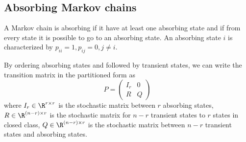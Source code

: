 \begin{refsection}
\subsection{Absorbing Markov chains}
\begin{definition}
	A Markov chain is absorbing if it have at least one absorbing state and if from every state it is possible to go to an absorbing state. An absorbing state $i$ is characterized by $p_{ii} = 1, p_{ij}=0,j\neq i$. 
\end{definition}

\begin{lemma}
	By ordering absorbing states and followed by transient states, we can write the transition matrix in the partitioned form as
	$$P = \begin{pmatrix}
	I_r & 0 \\ R & Q
	\end{pmatrix}$$
	where $I_r \in \R^{r\times r}$ is the stochastic matrix between $r$ absorbing states, $R \in \R^{(n-r)\times r}$ is the stochastic matrix for $n-r$ transient states to $r$ states in closed class, $Q \in \R^{(n-r)\times r}$ is the stochastic matrix between $n-r$ transient states and absorbing states.
\end{lemma}




\end{refsection}
